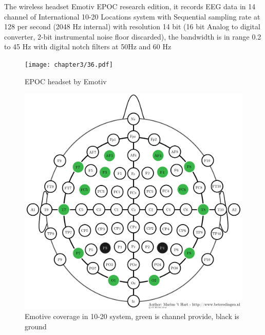 \hspace{1.5cm} The wireless headset Emotiv EPOC research edition, it records EEG data in 14 channel of International 10-20 Locations system with Sequential sampling rate at 128 per second (2048 Hz internal) with resolution 14 bit (16 bit Analog to digital converter, 2-bit instrumental noise floor discarded), the bandwidth is in range 0.2 to 45 Hz with digital notch filters at 50Hz and 60 Hz

\begin{figure}[ht]
	\centering
	\texttt{[image: chapter3/36.pdf]}
	\caption{EPOC headset by Emotiv\texttrademark}
\end{figure}

\begin{figure}[ht]
	\centering
	\includegraphics[scale = 0.4]{chapter3/emotiv_electrodes_cover.pdf}
	\caption{Emotive coverage in 10-20 system, green is channel provide, black is ground}
\end{figure}

